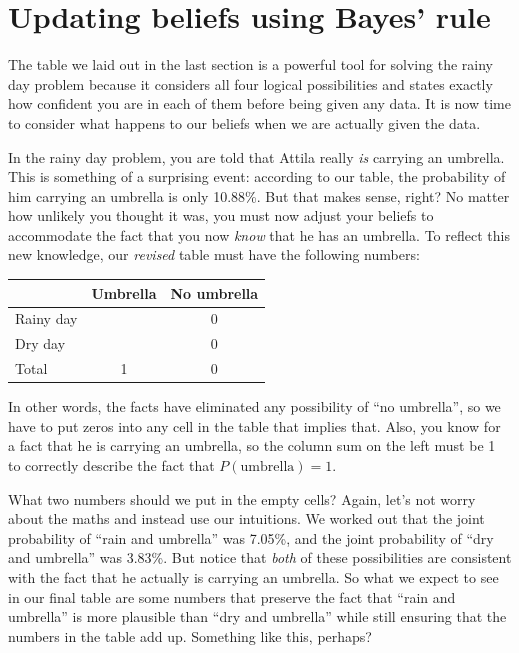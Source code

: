 \documentclass[
]{book}
\theoremstyle{definition}
\theoremstyle{definition}
\theoremstyle{definition}
\theoremstyle{definition}
\theoremstyle{remark}
\begin{document}
\hypertarget{updating-beliefs-using-bayes-rule}{%
\section{Updating beliefs using Bayes' rule}\label{updating-beliefs-using-bayes-rule}}

The table we laid out in the last section is a powerful tool for solving the rainy day problem because it considers all four logical possibilities and states exactly how confident you are in each of them before being given any data. It is now time to consider what happens to our beliefs when we are actually given the data.

In the rainy day problem, you are told that Attila really \emph{is} carrying an umbrella. This is something of a surprising event: according to our table, the probability of him carrying an umbrella is only 10.88\%. But that makes sense, right? No matter how unlikely you thought it was, you must now adjust your beliefs to accommodate the fact that you now \emph{know} that he has an umbrella. To reflect this new knowledge, our \emph{revised} table must have the following numbers:

\begin{longtable}[]{@{}lcc@{}}
\toprule()
& Umbrella & No umbrella \\
\midrule()
\endhead
Rainy day & & 0 \\
Dry day & & 0 \\
Total & 1 & 0 \\
\bottomrule()
\end{longtable}

In other words, the facts have eliminated any possibility of ``no umbrella'', so we have to put zeros into any cell in the table that implies that. Also, you know for a fact that he is carrying an umbrella, so the column sum on the left must be 1 to correctly describe the fact that \(P(\mbox{umbrella})=1\).

What two numbers should we put in the empty cells? Again, let's not worry about the maths and instead use our intuitions. We worked out that the joint probability of ``rain and umbrella'' was 7.05\%, and the joint probability of ``dry and umbrella'' was 3.83\%. But notice that \emph{both} of these possibilities are consistent with the fact that he actually is carrying an umbrella. So what we expect to see in our final table are some numbers that preserve the fact that ``rain and umbrella'' is more plausible than ``dry and umbrella'' while still ensuring that the numbers in the table add up. Something like this, perhaps?
\end{document}
